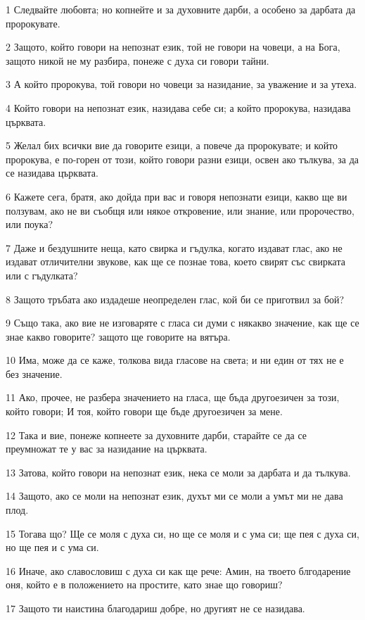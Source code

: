 \par 1 Следвайте любовта; но копнейте и за духовните дарби, а особено за дарбата да пророкувате.
\par 2 Защото, който говори на непознат език, той не говори на човеци, а на Бога, защото никой не му разбира, понеже с духа си говори тайни.
\par 3 А който пророкува, той говори но човеци за назидание, за уважение и за утеха.
\par 4 Който говори на непознат език, назидава себе си; а който пророкува, назидава църквата.
\par 5 Желал бих всички вие да говорите езици, а повече да пророкувате; и който пророкува, е по-горен от този, който говори разни езици, освен ако тълкува, за да се назидава църквата.
\par 6 Кажете сега, братя, ако дойда при вас и говоря непознати езици, какво ще ви ползувам, ако не ви съобщя или някое откровение, или знание, или пророчество, или поука?
\par 7 Даже и бездушните неща, като свирка и гъдулка, когато издават глас, ако не издават отличителни звукове, как ще се познае това, което свирят със свирката или с гъдулката?
\par 8 Защото тръбата ако издадеше неопределен глас, кой би се приготвил за бой?
\par 9 Също така, ако вие не изговаряте с гласа си думи с някакво значение, как ще се знае какво говорите? защото ще говорите на вятъра.
\par 10 Има, може да се каже, толкова вида гласове на света; и ни един от тях не е без значение.
\par 11 Ако, прочее, не разбера значението на гласа, ще бъда другоезичен за този, който говори; И тоя, който говори ще бъде другоезичен за мене.
\par 12 Така и вие, понеже копнеете за духовните дарби, старайте се да се преумножат те у вас за назидание на църквата.
\par 13 Затова, който говори на непознат език, нека се моли за дарбата и да тълкува.
\par 14 Защото, ако се моли на непознат език, духът ми се моли а умът ми не дава плод.
\par 15 Тогава що? Ще се моля с духа си, но ще се моля и с ума си; ще пея с духа си, но ще пея и с ума си.
\par 16 Иначе, ако славословиш с духа си как ще рече: Амин, на твоето блгодарение оня, който е в положението на простите, като знае що говориш?
\par 17 Защото ти наистина благодариш добре, но другият не се назидава.
